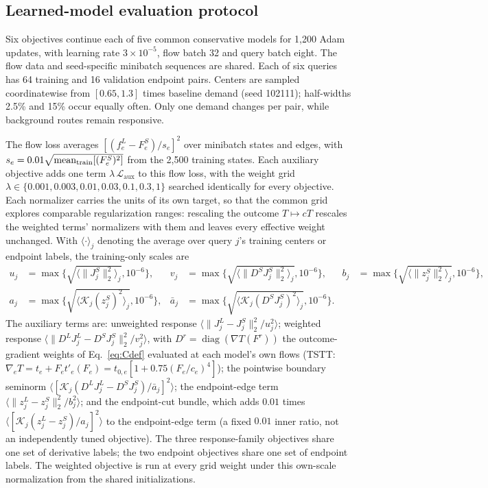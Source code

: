\subsection{Learned-model evaluation protocol}\label{app:pairs-v102}
Six objectives continue each of five common conservative models for
1,200 Adam updates, with learning rate $3\times10^{-5}$, flow batch 32
and query batch eight. The flow data and seed-specific minibatch
sequences are shared. Each of six queries has 64 training and 16
validation endpoint pairs. Centers are sampled coordinatewise from
$[0.65,1.3]$ times baseline demand (seed 102111); half-widths 2.5\% and
15\% occur equally often. Only one demand changes per pair, while
background routes remain responsive.

The flow loss averages $[(f_e^L-F_e^S)/s_e]^2$ over minibatch states
and edges, with $s_e=0.01\sqrt{\operatorname{mean}_{\rm train}[(F_e^S)^2]}$ from the
2,500 training states. Each auxiliary objective adds one term
$\lambda\,\mathcal L_{\mathrm{aux}}$ to this flow loss, with the weight
grid $\lambda\in\{0.001,0.003,0.01,0.03,0.1,0.3,1\}$ searched
identically for every objective. Each normalizer carries the units of
its own target, so that the common grid explores comparable
regularization ranges: rescaling the outcome $T\mapsto cT$ rescales
the weighted terms' normalizers with them and leaves every effective
weight unchanged. With
$\langle\cdot\rangle_j$ denoting the average over query $j$'s training
centers or endpoint labels, the training-only scales are
\[
\begin{aligned}
u_j&=\max\{\sqrt{\langle\|J_j^S\|_2^2\rangle_j},10^{-6}\},&
v_j&=\max\{\sqrt{\langle\|D^SJ_j^S\|_2^2\rangle_j},10^{-6}\},&
b_j&=\max\{\sqrt{\langle\|z_j^S\|_2^2\rangle_j},10^{-6}\},\\
a_j&=\max\{\sqrt{\langle\mathcal K_j(z_j^S)^2\rangle_j},10^{-6}\},&
\bar a_j&=\max\{\sqrt{\langle\mathcal K_j(D^SJ_j^S)^2\rangle_j},10^{-6}\}.
\end{aligned}
\]
The auxiliary terms are: unweighted response
$\langle\|J_j^L-J_j^S\|_2^2/u_j^2\rangle$; weighted response
$\langle\|D^LJ_j^L-D^SJ_j^S\|_2^2/v_j^2\rangle$, with
$D^r=\operatorname{diag}(\nabla T(F^r))$ the outcome-gradient weights
of Eq.~\eqref{eq:Cdef} evaluated at each model's own flows (TSTT:
$\nabla_eT=t_e+F_et'_e(F_e)=t_{0,e}[1+0.75(F_e/c_e)^4]$);
the pointwise boundary seminorm
$\langle[\mathcal K_j(D^LJ_j^L-D^SJ_j^S)/\bar a_j]^2\rangle$; the
endpoint-edge term
$\langle\|z_j^L-z_j^S\|_2^2/b_j^2\rangle$; and the endpoint-cut bundle,
which adds $0.01$ times
$\langle[\mathcal K_j(z_j^L-z_j^S)/a_j]^2\rangle$ to the endpoint-edge
term (a fixed $0.01$ inner ratio, not an independently tuned
objective). The three
response-family objectives share one set of derivative labels; the two
endpoint objectives share one set of endpoint labels. The weighted
objective is run at every grid weight under this own-scale
normalization from the shared initializations.

